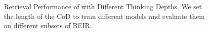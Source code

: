    

    

\begin{figure}[t]
    \centering
    \caption{Retrieval Performance of \method{} with Different Thinking Depths. We set the length of the CoD to train different \method{} models and evaluate them on different subsets of BEIR.}
    \label{fig:different_tokens}
\end{figure}